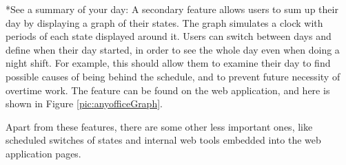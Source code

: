 \documentclass[11pt,singleside]{myfithesis2}
\makeatletter
\renewcommand\paragraph{
   \vspace{-10pt}
   \@startsection{paragraph}{4}{0mm}
      {\baselineskip}
      {- 5pt}
      {\normalfont\normalsize\bfseries}
}
\makeatother
\begin{document}
\paragraph*{See a summary of your day: } A secondary feature allows users to sum up their day by displaying a graph of their states. The graph simulates a clock with periods of each state displayed around it. Users can switch between days and define when their day started, in order to see the whole day even when doing a night shift. For example, this should allow them to examine their day to find possible causes of being behind the schedule, and to prevent future necessity of overtime work. The feature can be found on the web application, and here is shown in Figure \ref{pic:anyofficeGraph}.

Apart from these features, there are some other less important ones, like scheduled switches of states and internal web tools embedded into the web application pages.
\end{document}
